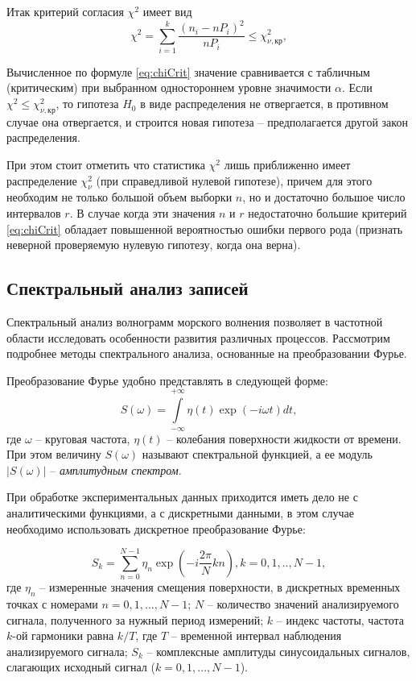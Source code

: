 Итак критерий согласия $\chi^2$ имеет вид
\begin{equation}\label{eq:chiCrit}
  \chi^2=\sum\limits_{i=1}^k\frac{(n_i-nP_i)^2}{nP_i}\le\chi_{\nu,кр}^2,
\end{equation}

Вычисленное по формуле \eqref{eq:chiCrit} значение сравнивается с табличным (критическим) при выбранном одностороннем уровне значимости $\alpha$. Если $\chi^2\le\chi_{\nu,кр}^2$, то гипотеза $H_0$ в виде распределения не отвергается, в противном случае она отвергается, и строится новая гипотеза -- предполагается другой закон распределения.

При этом стоит отметить что статистика $\chi^2$ лишь приближенно имеет распределение $\chi^2_{\nu}$ (при справедливой нулевой гипотезе), причем для этого необходим не только большой объем выборки $n$, но и достаточно большое число интервалов $r$. В случае когда эти значения $n$ и $r$ недостаточно большие критерий \eqref{eq:chiCrit} обладает повышенной вероятностью ошибки первого рода  (признать неверной проверяемую нулевую гипотезу, когда она верна).

\subsection{ Спектральный анализ записей}

Спектральный анализ волнограмм морского волнения позволяет  в частотной области исследовать особенности развития различных процессов. Рассмотрим подробнее методы спектрального анализа, основанные на преобразовании Фурье.

Преобразование Фурье удобно представлять в следующей форме:
\begin{equation}\label{eq:fourier}
  S(\omega)=\int\limits^{+\infty}_{-\infty}\eta(t)\exp(-i\omega t)dt,
\end{equation}
\noindent
где $\omega$ -- круговая частота, $\eta(t)$ -- колебания поверхности жидкости от времени.  При этом величину $S(\omega)$ называют спектральной функцией, а ее модуль $|S(\omega)|$ -- \emph{амплитудным спектром}.

При обработке экспериментальных данных приходится иметь дело не с аналитическими функциями, а с дискретными данными, в этом случае необходимо использовать дискретное преобразование Фурье:

\begin{equation}\label{eq:fourierDiscr}
  S_k=\sum\limits^{N-1}_{n=0}\eta_n\exp(-i\frac{2\pi}{N}kn),
  k=0,1,..,N-1,
\end{equation}
\noindent
где $\eta_n$ -- измеренные значения смещения поверхности, в дискретных временных точках с номерами $n=0,1,...,N-1$;
$N$ -- количество значений анализируемого сигнала, полученного за нужный период измерений;
$k$ -- индекс частоты, частота $k$-ой гармоники равна $k/T$, где $T$ -- временной интервал наблюдения анализируемого сигнала;
$S_k$ -- комплексные амплитуды синусоидальных сигналов, слагающих исходный сигнал ($k=0,1,...,N-1$).


